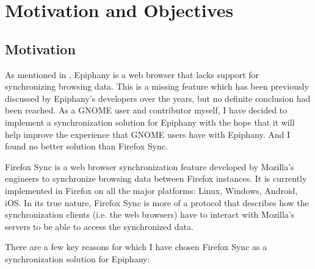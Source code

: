 \chapter{Motivation and Objectives}
\label{chapter:motivation-objectives}

\section{Motivation}
\label{sec:motivation}

As mentioned in , Epiphany is a web browser that lacks support for synchronizing browsing data. This is a missing feature which has been previously discussed by Epiphany's developers over the years, but no definite conclusion had been reached. As a GNOME user and contributor myself, I have decided to implement a synchronization solution for Epiphany with the hope that it will help improve the experience that GNOME users have with Epiphany. And I found no better solution than Firefox Sync.

Firefox Sync is a web browser synchronization feature developed by Mozilla's engineers to synchronize browsing data between Firefox instances. It is currently implemented in Firefox on all the major platforms: Linux, Windows, Android, iOS. In its true nature, Firefox Sync is more of a protocol that describes how the synchronization clients  (i.e. the web browsers) have to interact with Mozilla's servers to be able to access the synchronized data.

There are a few key reasons for which I have chosen Firefox Sync as a synchronization solution for Epiphany:

